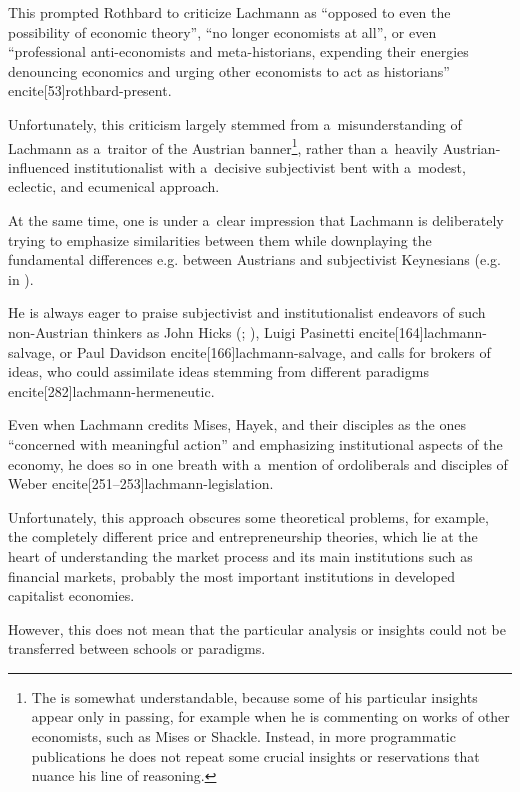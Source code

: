 {This prompted Rothbard to criticize Lachmann as ``opposed to even the possibility of economic theory'', ``no longer economists at all'', or even ``professional anti-economists and meta-historians, expending their energies denouncing economics and urging other economists to act as historians'' encite[53]{rothbard-present}.

Unfortunately, this criticism largely stemmed from a~misunderstanding of Lachmann as a~traitor of the Austrian banner\footnote{The is somewhat understandable, because some of his particular insights appear only in passing, for example when he is commenting on works of other economists, such as Mises or Shackle. Instead, in more programmatic publications he does not repeat some crucial insights or reservations that nuance his line of reasoning.}, rather than a~heavily Austrian-influenced institutionalist with a~decisive subjectivist bent with a~modest, eclectic, and ecumenical approach.



At the same time, one is under a~clear impression that Lachmann is deliberately trying to emphasize similarities between them while downplaying the fundamental differences e.g. between Austrians and subjectivist Keynesians (e.g. in \cite[184]{lachmann-keynes}).

He is always eager to praise subjectivist and institutionalist endeavors of such non-Austrian thinkers as John Hicks (\cite[218]{lachmann-vicissitudes}; \citeyear[184]{lachmann-keynes}), Luigi Pasinetti encite[164]{lachmann-salvage}, or Paul Davidson encite[166]{lachmann-salvage}, and calls for brokers of ideas, who could assimilate ideas stemming from different paradigms encite[282]{lachmann-hermeneutic}.

Even when Lachmann credits Mises, Hayek, and their disciples as the ones ``concerned with meaningful action'' and emphasizing institutional aspects of the economy, he does so in one breath with a~mention of ordoliberals and disciples of Weber encite[251--253]{lachmann-legislation}.



Unfortunately, this approach obscures some theoretical problems, for example, the completely different price and entrepreneurship theories, which lie at the heart of understanding the market process and its main institutions such as financial markets, probably the most important institutions in developed capitalist economies.

However, this does not mean that the particular analysis or insights could not be transferred between schools or paradigms.



}

